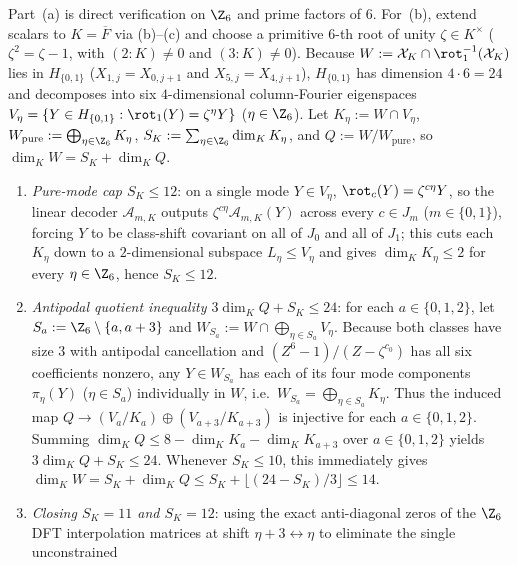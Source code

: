 \begin{outline}
Part~(a) is direct verification on $\Z_6$ and prime factors of $6$. For~(b), extend scalars to
$K = \overline{F}$ via (b)--(c) and choose a primitive $6$-th root of
unity $\zeta \in K^\times$ ($\zeta^2 = \zeta - 1$, with $(2 : K) \ne 0$ and $(3 : K) \ne 0$). Because
$W := \mathcal{X}_K \cap \rot_1^{-1}(\mathcal{X}_K)$ lies in $H_{\{0,1\}}$ ($X_{1,j} = X_{0,j+1}$ and
$X_{5,j} = X_{4,j+1}$), $H_{\{0,1\}}$ has dimension $4 \cdot 6 = 24$ and decomposes into six
$4$-dimensional column-Fourier eigenspaces $V_\eta = \{Y \in H_{\{0,1\}} : \rot_1(Y) = \zeta^\eta Y\}$
($\eta \in \Z_6$). Let $K_\eta := W \cap V_\eta$, $W_{\mathrm{pure}} := \bigoplus_{\eta \in \Z_6} K_\eta$,
$S_K := \sum_{\eta \in \Z_6} \dim_K K_\eta$, and $Q := W / W_{\mathrm{pure}}$, so
$\dim_K W = S_K + \dim_K Q$.
\begin{enumerate}[label=\arabic*.,leftmargin=1.5em]
\item \emph{Pure-mode cap $S_K \le 12$}: on a single mode $Y \in V_\eta$, $\rot_c(Y) = \zeta^{c\eta} Y$,
  so the linear decoder $\mathcal{A}_{m,K}$ outputs $\zeta^{c\eta}\mathcal{A}_{m,K}(Y)$ across every
  $c \in J_m$ ($m \in \{0,1\}$), forcing $Y$ to be class-shift covariant on all of $J_0$ and all of
  $J_1$; this cuts each $K_\eta$ down to a $2$-dimensional subspace $L_\eta \le V_\eta$ and gives
  $\dim_K K_\eta \le 2$ for every $\eta \in \Z_6$, hence $S_K \le 12$.
\item \emph{Antipodal quotient inequality $3\dim_K Q + S_K \le 24$}: for each $a \in \{0, 1, 2\}$, let
  $S_a := \Z_6 \setminus \{a, a + 3\}$ and $W_{S_a} := W \cap \bigoplus_{\eta \in S_a} V_\eta$. Because
  both classes have size $3$ with antipodal cancellation and $(Z^6 - 1)/(Z - \zeta^{c_0})$ has all six
  coefficients nonzero, any $Y \in W_{S_a}$ has each of its four mode components $\pi_\eta(Y)$
  ($\eta \in S_a$) individually in $W$, i.e.\ $W_{S_a} = \bigoplus_{\eta \in S_a} K_\eta$. Thus the
  induced map $Q \to (V_a / K_a) \oplus (V_{a+3} / K_{a+3})$ is injective for each $a \in \{0,1,2\}$.
  Summing $\dim_K Q \le 8 - \dim_K K_a - \dim_K K_{a+3}$ over $a \in \{0,1,2\}$ yields
  $3\dim_K Q + S_K \le 24$. Whenever $S_K \le 10$, this immediately gives
  $\dim_K W = S_K + \dim_K Q \le S_K + \lfloor(24 - S_K)/3\rfloor \le 14$.
\item \emph{Closing $S_K = 11$ and $S_K = 12$}: using the exact anti-diagonal zeros of the $\Z_6$ DFT
  interpolation matrices at shift $\eta + 3 \leftrightarrow \eta$ to eliminate the single unconstrained

\end{enumerate}
\end{outline}

